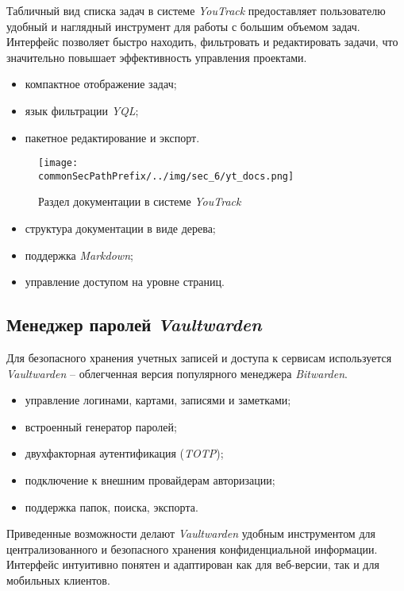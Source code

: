 Табличный вид списка задач в системе \textit{YouTrack} предоставляет пользователю удобный и наглядный инструмент для работы с большим объемом задач. Интерфейс позволяет быстро находить, фильтровать и редактировать задачи, что значительно повышает эффективность управления проектами.

\begin{itemize}
    \item компактное отображение задач;
    \item язык фильтрации \textit{YQL};
    \item пакетное редактирование и экспорт.
\end{itemize}

\begin{figure}[ht]
    \centering
    \texttt{[image: \\commonSecPathPrefix/../img/sec\_6/yt\_docs.png]}
    \caption{Раздел документации в системе \textit{YouTrack}}
    \label{fig:user_guide:yt_docs}
\end{figure}

\begin{itemize}
    \item структура документации в виде дерева;
    \item поддержка \textit{Markdown};
    \item управление доступом на уровне страниц.
\end{itemize}

\subsection{Менеджер паролей \textit{Vaultwarden}}

Для безопасного хранения учетных записей и доступа к сервисам используется \textit{Vaultwarden}\cite{vaultwarden} -- облегченная версия популярного менеджера \textit{Bitwarden}.

\begin{itemize}
    \item управление логинами, картами, записями и заметками;
    \item встроенный генератор паролей;
    \item двухфакторная аутентификация (\textit{TOTP});
    \item подключение к внешним провайдерам авторизации;
    \item поддержка папок, поиска, экспорта.
\end{itemize}

Приведенные возможности делают \textit{Vaultwarden} удобным инструментом для централизованного и безопасного хранения конфиденциальной информации. Интерфейс интуитивно понятен и адаптирован как для веб-версии, так и для мобильных клиентов.

